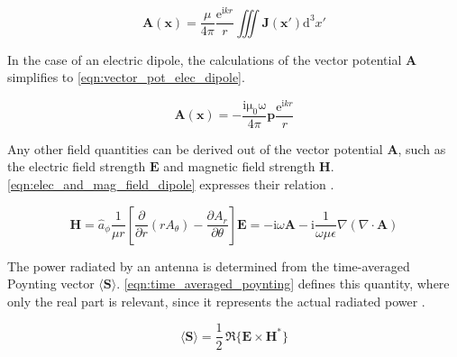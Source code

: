 \begin{equation}
    \mathbf{A}(\mathbf{x})=\frac{\mu}{4\pi}\frac{\mathrm{e}^{\mathrm{i}kr}}{r}\iiint \mathbf{J}(\mathbf{x'})\mathrm{d}^3x'
    \label{eqn:vector_pot}
\end{equation}

In the case of an electric dipole, the calculations of the vector potential $\mathbf{A}$ simplifies to \autoref{eqn:vector_pot_elec_dipole}\cite{Jackson}.

\begin{equation}
    \mathbf{A} (\mathbf{x})=-\frac{\mathrm{i\mu_0\omega}}{4\pi}\mathbf{p}\frac{\mathrm{e}^{\mathrm{i}kr}}{r}
    \label{eqn:vector_pot_elec_dipole}
\end{equation}

Any other field quantities can be derived out of the vector potential $\mathbf{A}$, such as the electric field strength $\mathbf{E}$ and magnetic field strength $\mathbf{H}$. \autoref{eqn:elec_and_mag_field_dipole} expresses their relation \cite{Balanis_1997}. 

\begin{subequations}\label{eqn:elec_and_mag_field_dipole}
    \begin{equation}
    \mathbf{H} = \hat{a}_{\phi} \frac{1}{\mu r} \left[ \frac{\partial}{\partial r} (r A_{\theta}) - \frac{\partial A_{r}}{\partial \theta} \right]
    \end{equation}
    
    \begin{equation}
    \mathbf{E}=-\mathrm{i}\omega\mathbf{A}-\mathrm{i}\frac{1}{\omega\mu\epsilon}\nabla\left(\nabla\cdot\mathbf{A}\right)
    \end{equation}
    
\end{subequations}

The power radiated by an antenna is determined from the time-averaged Poynting vector $ \langle \mathbf{S} \rangle$. \autoref{eqn:time_averaged_poynting} defines this quantity, where only the real part is relevant, since it represents the actual radiated power \cite{Balanis_1997}.

\begin{equation}
    \langle \mathbf{S} \rangle = \frac{1}{2} \, \Re \{ \mathbf{E} \times \mathbf{H}^* \}
    \label{eqn:time_averaged_poynting}
\end{equation}

